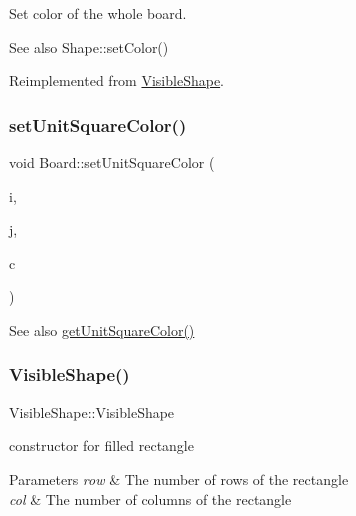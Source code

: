 Set color of the whole board. 

\begin{DoxySeeAlso}{See also}
Shape\+::set\+Color() 
\end{DoxySeeAlso}


Reimplemented from \mbox{\hyperlink{class_visible_shape_a69ae0940d090fec376bee8dc6861b8dc}{Visible\+Shape}}.

\mbox{\label{class_board_a9c8fc3e645f56bec246a27459f5c75ec}} 
\subsubsection{\texorpdfstring{set\+Unit\+Square\+Color()}{setUnitSquareColor()}}
{\footnotesize\ttfamily void Board\+::set\+Unit\+Square\+Color (\begin{DoxyParamCaption}\item[{const int \&}]{i,  }\item[{const int \&}]{j,  }\item[{const \mbox{\hyperlink{class_r_g_b_color}{R\+G\+B\+Color}} \&}]{c }\end{DoxyParamCaption})\hspace{0.3cm}{\ttfamily [virtual]}}

\begin{DoxySeeAlso}{See also}
\mbox{\hyperlink{class_board_a6e6a947ec66c09bff4559fd9650b9b1d}{get\+Unit\+Square\+Color()}} 
\end{DoxySeeAlso}
\mbox{\label{class_board_adc9d11f72af8b96fdb379330fd9de592}} 
\subsubsection{\texorpdfstring{Visible\+Shape()}{VisibleShape()}\hspace{0.1cm}{\footnotesize\ttfamily [1/3]}}
{\footnotesize\ttfamily Visible\+Shape\+::\+Visible\+Shape}



constructor for filled rectangle 


\begin{DoxyParams}{Parameters}
{\em row} & The number of rows of the rectangle \\
\hline
{\em col} & The number of columns of the rectangle \\
\hline
\end{DoxyParams}
\mbox{\label{class_board_a0efa89e218acbaeaf4f2453467d54cc9}} 

